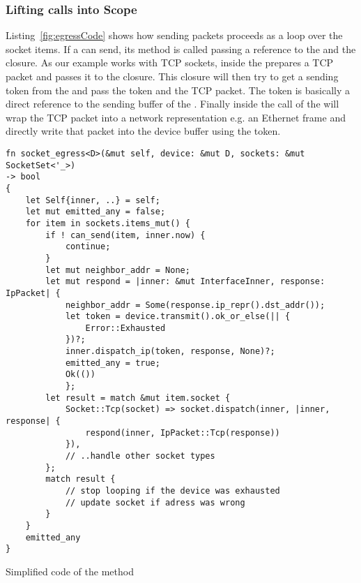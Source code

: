 \subsubsection{Lifting \dev{} calls into Scope}
\label{subsec:DeviceLifting}
Listing~\ref{fig:egressCode} shows how sending packets proceeds as a loop over the socket items. If a  can send, its  method is called passing a reference to the \stack{} and the  closure. As our example works with TCP sockets, inside  the  prepares a TCP packet and passes it to the  closure. This closure will then try to get a sending token from the \dev{} and pass the token and the TCP packet. The token is basically a direct reference to the sending buffer of the \dev{}. Finally inside the  call of the  will wrap the TCP packet into a network representation e.g. an Ethernet frame and directly write that packet into the device buffer using the token.\\
 
\begin{codefigure}[H]
    \centering
    
\begin{verbatim}
fn socket_egress<D>(&mut self, device: &mut D, sockets: &mut SocketSet<'_>) 
-> bool
{
    let Self{inner, ..} = self;
    let mut emitted_any = false;
    for item in sockets.items_mut() {
        if ! can_send(item, inner.now) {
            continue;
        }
        let mut neighbor_addr = None;
        let mut respond = |inner: &mut InterfaceInner, response: IpPacket| {
            neighbor_addr = Some(response.ip_repr().dst_addr());
            let token = device.transmit().ok_or_else(|| {
                Error::Exhausted
            })?;
            inner.dispatch_ip(token, response, None)?;
            emitted_any = true;
            Ok(())
            };
        let result = match &mut item.socket {
            Socket::Tcp(socket) => socket.dispatch(inner, |inner, response| {
                respond(inner, IpPacket::Tcp(response))
            }),
            // ..handle other socket types
        };
        match result {
            // stop looping if the device was exhausted
            // update socket if adress was wrong
        }
    }
    emitted_any
}
\end{verbatim}
    \caption{Simplified code of the  method}
    \label{fig:egressCode}
\end{codefigure}

